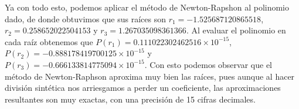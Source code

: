 \begin{itemize}
\begin{solution}
    Ya con todo esto, podemos aplicar el método de Newton-Rapshon al polinomio dado, de donde obtuvimos que sus raíces son $r_1 = -1.525687120865518$, $r_2 = 0.258652022504153$ y $r_3 = 1.267035098361366$. Al evaluar el polinomio en cada raíz obtenemos que $P(r_1) =  0.111022302462516 \times 10^{-15}$, $P(r_2)= -0.888178419700125 \times 10^{-15}$ y\\ $P(r_3)= -0.666133814775094 \times 10^{-15}$. Con esto podemos observar que el método de Newton-Raphson aproxima muy bien las raíces, pues aunque al hacer división sintética nos arriesgamos a perder un coeficiente, las aproximaciones resultantes son muy exactas, con una precisión de 15 cifras decimales.

    \end{solution}
\end{itemize}
